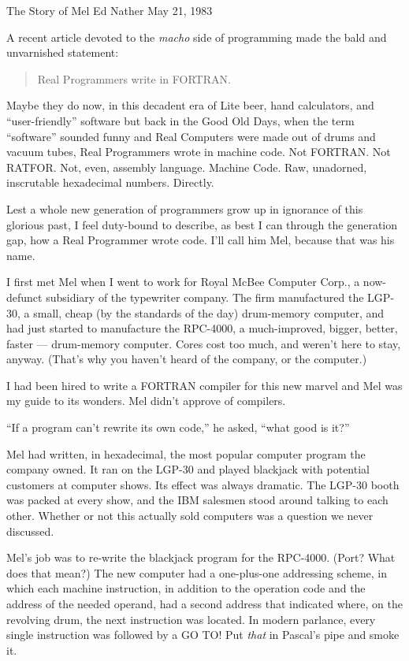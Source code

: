 \documentclass[12pt]{article}
\begin{document}
\noindent
The Story of Mel\newline
Ed Nather\newline
May 21, 1983

\bigskip
\noindent
A recent article devoted to the {\it macho} side of programming
made the bald and unvarnished statement:

\begin{quote}
Real Programmers write in FORTRAN.
\end{quote}

\noindent
Maybe they do now,
in this decadent era of
Lite beer, hand calculators, and ``user-friendly'' software
but back in the Good Old Days,
when the term ``software'' sounded funny
and Real Computers were made out of drums and vacuum tubes,
Real Programmers wrote in machine code.
Not FORTRAN.  Not RATFOR.  Not, even, assembly language.
Machine Code.
Raw, unadorned, inscrutable hexadecimal numbers.
Directly.

\bigskip
\noindent
Lest a whole new generation of programmers
grow up in ignorance of this glorious past,
I feel duty-bound to describe,
as best I can through the generation gap,
how a Real Programmer wrote code.
I'll call him Mel,
because that was his name.

\bigskip
\noindent
I first met Mel when I went to work for Royal McBee Computer Corp.,
a now-defunct subsidiary of the typewriter company.
The firm manufactured the LGP-30,
a small, cheap (by the standards of the day)
drum-memory computer,
and had just started to manufacture
the RPC-4000, a much-improved,
bigger, better, faster --- drum-memory computer.
Cores cost too much,
and weren't here to stay, anyway.
(That's why you haven't heard of the company,
or the computer.)

\bigskip
\noindent
I had been hired to write a FORTRAN compiler
for this new marvel and Mel was my guide to its wonders.
Mel didn't approve of compilers.

\bigskip
\noindent
``If a program can't rewrite its own code,''
he asked, ``what good is it?''

\bigskip
\noindent
Mel had written,
in hexadecimal,
the most popular computer program the company owned.
It ran on the LGP-30
and played blackjack with potential customers
at computer shows.
Its effect was always dramatic.
The LGP-30 booth was packed at every show,
and the IBM salesmen stood around
talking to each other.
Whether or not this actually sold computers
was a question we never discussed.

\bigskip
\noindent
Mel's job was to re-write
the blackjack program for the RPC-4000.
(Port?  What does that mean?)
The new computer had a one-plus-one
addressing scheme,
in which each machine instruction,
in addition to the operation code
and the address of the needed operand,
had a second address that indicated where, on the revolving drum,
the next instruction was located.
In modern parlance,
every single instruction was followed by a GO TO!
Put {\it that} in Pascal's pipe and smoke it.
\end{document}
